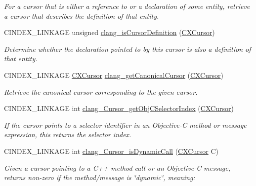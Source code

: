 \begin{DoxyCompactItemize}
\begin{DoxyCompactList}\small\item\em For a cursor that is either a reference to or a declaration of some entity, retrieve a cursor that describes the definition of that entity. \end{DoxyCompactList}\item 
\mbox{\label{group__CINDEX__CURSOR__XREF_ga6ad05634a73e693217088eaa693f0010}} 
C\+I\+N\+D\+E\+X\+\_\+\+L\+I\+N\+K\+A\+GE unsigned \hyperlink{group__CINDEX__CURSOR__XREF_ga6ad05634a73e693217088eaa693f0010}{clang\+\_\+is\+Cursor\+Definition} (\hyperlink{structCXCursor}{C\+X\+Cursor})
\begin{DoxyCompactList}\small\item\em Determine whether the declaration pointed to by this cursor is also a definition of that entity. \end{DoxyCompactList}\item 
C\+I\+N\+D\+E\+X\+\_\+\+L\+I\+N\+K\+A\+GE \hyperlink{structCXCursor}{C\+X\+Cursor} \hyperlink{group__CINDEX__CURSOR__XREF_gac802826668be9fd40a017523cc7d24fe}{clang\+\_\+get\+Canonical\+Cursor} (\hyperlink{structCXCursor}{C\+X\+Cursor})
\begin{DoxyCompactList}\small\item\em Retrieve the canonical cursor corresponding to the given cursor. \end{DoxyCompactList}\item 
C\+I\+N\+D\+E\+X\+\_\+\+L\+I\+N\+K\+A\+GE int \hyperlink{group__CINDEX__CURSOR__XREF_ga3ea92edf682a5a734e5f4d0c2217f0b8}{clang\+\_\+\+Cursor\+\_\+get\+Obj\+C\+Selector\+Index} (\hyperlink{structCXCursor}{C\+X\+Cursor})
\begin{DoxyCompactList}\small\item\em If the cursor points to a selector identifier in an Objective-\/C method or message expression, this returns the selector index. \end{DoxyCompactList}\item 
C\+I\+N\+D\+E\+X\+\_\+\+L\+I\+N\+K\+A\+GE int \hyperlink{group__CINDEX__CURSOR__XREF_gad1e793914af7b7bf286d58a34e90ab6c}{clang\+\_\+\+Cursor\+\_\+is\+Dynamic\+Call} (\hyperlink{structCXCursor}{C\+X\+Cursor} C)
\begin{DoxyCompactList}\small\item\em Given a cursor pointing to a C++ method call or an Objective-\/C message, returns non-\/zero if the method/message is \char`\"{}dynamic\char`\"{}, meaning\+: \end{DoxyCompactList}\item 

\end{DoxyCompactItemize}

